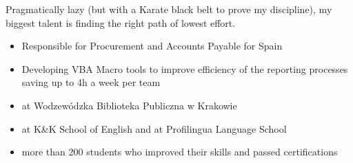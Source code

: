 \documentclass[10pt,a4paper]{../altacv}
\begin{document}

\begin{fullwidth}
\makecvheader
\end{fullwidth}

Pragmatically lazy (but with a Karate black belt to prove my discipline), my biggest talent is finding the right path of lowest effort.
\smallskip


\begin{itemize}
	\item Responsible for Procurement and Accounts Payable for Spain
	\item Developing VBA Macro tools to improve efficiency of the reporting processes saving up to 4h a week per team
\end{itemize}

\divider

\begin{itemize}
	\item at Wodzewódzka Biblioteka Publiczna w Krakowie
	\item at K\&K School of English and at Profilingua Language School
	\item more than 200 students who improved their skills and passed certifications
\end{itemize}
\smallskip
\end{document}
